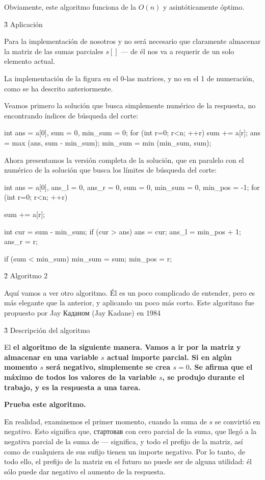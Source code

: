 Obviamente, este algoritmo funciona de la $O(n)$ y asintóticamente óptimo.

\h3{ Aplicación }

Para la implementación de nosotros y no será necesario que claramente almacenar la matriz de las sumas parciales $s[]$ --- de él nos va a requerir de un solo elemento actual.

La implementación de la figura en el 0-las matrices, y no en el 1 de numeración, como se ha descrito anteriormente.

Veamos primero la solución que busca simplemente numérico de la respuesta, no encontrando índices de búsqueda del corte:

\code
int ans = a[0],
sum = 0,
min_sum = 0;
for (int r=0; r<n; ++r) {
sum += a[r];
ans = max (ans, sum - min_sum);
min_sum = min (min_sum, sum);
}
\endcode

Ahora presentamos la versión completa de la solución, que en paralelo con el numérico de la solución que busca los límites de búsqueda del corte:

\code
int ans = a[0],
ans_l = 0,
ans_r = 0,
sum = 0,
min_sum = 0,
min_pos = -1;
for (int r=0; r<n; ++r) {
sum += a[r];

int cur = sum - min_sum;
if (cur > ans) {
ans = cur;
ans_l = min_pos + 1;
ans_r = r;
}

if (sum < min_sum) {
min_sum = sum;
min_pos = r;
}
}
\endcode


\h2{ Algoritmo 2 }

Aquí vamos a ver otro algoritmo. Él es un poco complicado de entender, pero es más elegante que la anterior, y aplicando un poco más corto. Este algoritmo fue propuesto por Jay Каданом (Jay Kadane) en 1984

\h3{ Descripción del algoritmo }

El \bf{el algoritmo} de la siguiente manera. Vamos a ir por la matriz y almacenar en una variable $s$ actual importe parcial. Si en algún momento $s$ será negativo, simplemente se crea $s=0$. Se afirma que el máximo de todos los valores de la variable $s$, se produjo durante el trabajo, y es la respuesta a una tarea.

\bf{Prueba} este algoritmo.

En realidad, examinemos el primer momento, cuando la suma de $s$ se convirtió en negativo. Esto significa que, стартовав con cero parcial de la suma, que llegó a la negativa parcial de la suma de --- significa, y todo el prefijo de la matriz, así como de cualquiera de sus sufijo tienen un importe negativo. Por lo tanto, de todo ello, el prefijo de la matriz en el futuro no puede ser de alguna utilidad: él sólo puede dar negativo el aumento de la respuesta.

